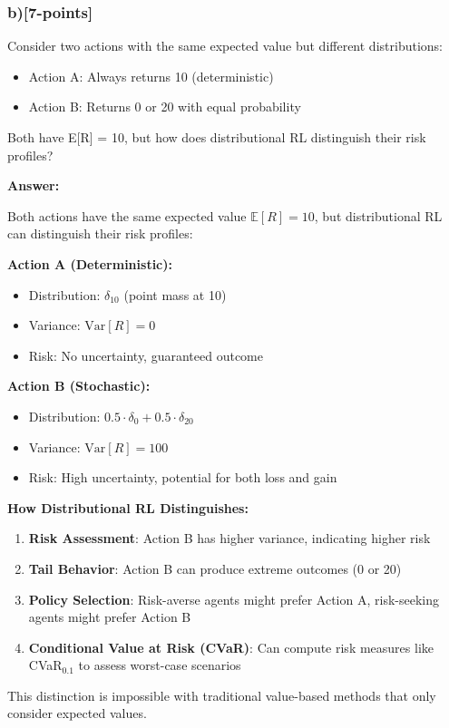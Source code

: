 \documentclass[12pt]{article}
\begin{document}
{{\subsubsection{b)[7-points]} Consider two actions with the same expected value but different distributions:
\begin{itemize}
\item Action A: Always returns 10 (deterministic)
\item Action B: Returns 0 or 20 with equal probability
\end{itemize}
Both have E[R] = 10, but how does distributional RL distinguish their risk profiles?

\textbf{Answer:}

Both actions have the same expected value $\mathbb{E}[R] = 10$, but distributional RL can distinguish their risk profiles:

\textbf{Action A (Deterministic):}
\begin{itemize}
\item Distribution: $\delta_{10}$ (point mass at 10)
\item Variance: $\text{Var}[R] = 0$
\item Risk: No uncertainty, guaranteed outcome
\end{itemize}

\textbf{Action B (Stochastic):}
\begin{itemize}
\item Distribution: $0.5 \cdot \delta_0 + 0.5 \cdot \delta_{20}$
\item Variance: $\text{Var}[R] = 100$
\item Risk: High uncertainty, potential for both loss and gain
\end{itemize}

\textbf{How Distributional RL Distinguishes:}
\begin{enumerate}
\item \textbf{Risk Assessment}: Action B has higher variance, indicating higher risk
\item \textbf{Tail Behavior}: Action B can produce extreme outcomes (0 or 20)
\item \textbf{Policy Selection}: Risk-averse agents might prefer Action A, risk-seeking agents might prefer Action B
\item \textbf{Conditional Value at Risk (CVaR)}: Can compute risk measures like CVaR$_{0.1}$ to assess worst-case scenarios
\end{enumerate}

This distinction is impossible with traditional value-based methods that only consider expected values.

}}
\end{document}
